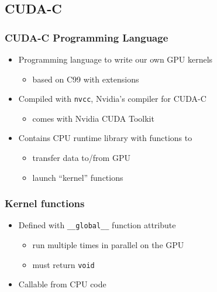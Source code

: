 \subsection{CUDA-C}\label{cuda-c}

\subsubsection{CUDA-C Programming
Language}\label{cuda-c-programming-language}

\begin{itemize}
\itemsep1pt\parskip0pt
\item
  Programming language to write our own GPU kernels

  \begin{itemize}
  \itemsep1pt\parskip0pt
  \item
    based on C99 with extensions
  \end{itemize}
\item
  Compiled with \texttt{nvcc}, Nvidia's compiler for CUDA-C

  \begin{itemize}
  \itemsep1pt\parskip0pt
  \item
    comes with Nvidia CUDA Toolkit
  \end{itemize}
\item
  Contains CPU runtime library with functions to

  \begin{itemize}
  \itemsep1pt\parskip0pt
  \item
    transfer data to/from GPU
  \item
    launch ``kernel'' functions
  \end{itemize}
\end{itemize}

\subsubsection{Kernel functions}\label{kernel-functions}

\begin{itemize}
\itemsep1pt\parskip0pt
\item
  Defined with \texttt{\_\_global\_\_} function attribute

  \begin{itemize}
  \itemsep1pt\parskip0pt
  \item
    run multiple times in parallel on the GPU
  \item
    must return \texttt{void}
  \end{itemize}
\item
  Callable from CPU code
\end{itemize}

